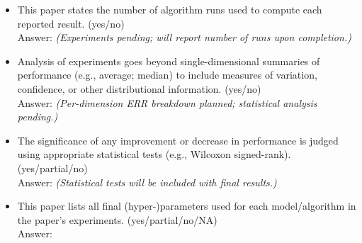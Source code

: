 \begin{itemize}
    Answer: \answerYes{}
    \item This paper states the number of algorithm runs used to compute each reported result. (yes/no)\\
    Answer: \answerNO{} \textit{(Experiments pending; will report number of runs upon completion.)}
    \item Analysis of experiments goes beyond single-dimensional summaries of performance (e.g., average; median) to include measures of variation, confidence, or other distributional information. (yes/no)\\
        Answer: \answerNO{} \textit{(Per-dimension ERR breakdown planned; statistical analysis pending.)}
    \item The significance of any improvement or decrease in performance is judged using appropriate statistical tests (e.g., Wilcoxon signed-rank). (yes/partial/no)\\
    Answer: \answerNO{} \textit{(Statistical tests will be included with final results.)}
    \item This paper lists all final (hyper-)parameters used for each model/algorithm in the paper's experiments. (yes/partial/no/NA)\\
    Answer: \answerYes{}
\end{itemize}
